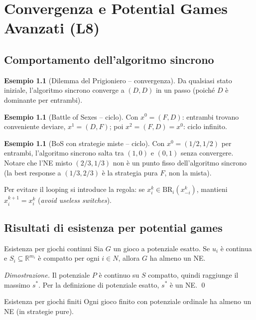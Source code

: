 \documentclass[12pt,a4paper,twoside]{book}
\theoremstyle{plain}
\theoremstyle{definition}
\newtheorem{example}[theorem]{Esempio}
\newcommand{\BR}{\mathrm{BR}}
\begin{document}
\chapter{Convergenza e Potential Games Avanzati (L8)}

\section{Comportamento dell'algoritmo sincrono}

\begin{example}[Dilemma del Prigioniero -- convergenza]
Da qualsiasi stato iniziale, l'algoritmo sincrono converge a $(D,D)$ in un passo (poiché $D$ è dominante per entrambi).
\end{example}

\begin{example}[Battle of Sexes -- ciclo]
Con $x^0=(F,D)$: entrambi trovano conveniente deviare, $x^1=(D,F)$; poi $x^2=(F,D)=x^0$: ciclo infinito.
\end{example}

\begin{example}[BoS con strategie miste -- ciclo]
Con $x^0=(1/2,1/2)$ per entrambi, l'algoritmo sincrono salta tra $(1,0)$ e $(0,1)$ senza convergere. Notare che l'NE misto $(2/3,1/3)$ non è un punto fisso dell'algoritmo sincrono (la best response a $(1/3,2/3)$ è la strategia pura $F$, non la mista).
\end{example}

Per evitare il looping si introduce la regola: se $x_i^k\in\BR_i(x_{-i}^k)$, mantieni $x_i^{k+1}=x_i^k$ (\emph{avoid useless switches}).

\section{Risultati di esistenza per potential games}

\begin{thmbox}{Esistenza per giochi continui}
Sia $G$ un gioco a potenziale esatto. Se $u_i$ è continua e $S_i\subseteq\mathbb{R}^{m_i}$ è compatto per ogni $i\in N$, allora $G$ ha almeno un NE.
\end{thmbox}
\textit{Dimostrazione.} Il potenziale $P$ è continuo su $S$ compatto, quindi raggiunge il massimo $s^*$. Per la definizione di potenziale esatto, $s^*$ è un NE. \qed

\begin{thmbox}{Esistenza per giochi finiti}
Ogni gioco finito con potenziale ordinale ha almeno un NE (in strategie pure).
\end{thmbox}
\end{document}
